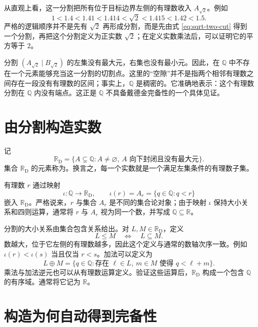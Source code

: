\documentclass[UTF8,12pt,a4paper,fontset=fandol]{ctexbook}
\begin{document}
从直观上看，这一分割把所有位于目标边界左侧的有理数收入 $A_{\sqrt{2}}$。例如
\[
  1<1.4<1.41<1.414<\sqrt{2}<1.415<1.42<1.5.
\]
严格的逻辑顺序并不是先有 $\sqrt{2}$ 再形成分割，而是先由式 \eqref{eq:sqrt-two-cut} 得到一个分割，再把这个分割定义为正实数 $\sqrt{2}$；在定义实数乘法后，可以证明它的平方等于 $2$。

\begin{remark}[有理数域中的空隙]
分割 $(A_{\sqrt{2}}\mid B_{\sqrt{2}})$ 的左集没有最大元，右集也没有最小元。因此，在 $\mathbb{Q}$ 中不存在一个元素能够充当这一分割的切割点。这里的“空隙”并不是指两个相邻有理数之间存在一段没有有理数的区间；事实上，$\mathbb{Q}$ 是稠密的。它准确地表示：这个有理数分割在 $\mathbb{Q}$ 内没有端点。这正是 $\mathbb{Q}$ 不具备戴德金完备性的一个具体见证。
\end{remark}

\section{由分割构造实数}

\begin{definition}[戴德金实数]
记
\[
  \mathbb{R}_{\mathrm D}
  =\bigl\{A\subsetneq\mathbb{Q}:A\ne\varnothing,
  \ A\text{ 向下封闭且没有最大元}\bigr\}.
\]
集合 $\mathbb{R}_{\mathrm D}$ 的元素称为。换言之，每一个实数就是一个满足左集条件的有理数子集。
\end{definition}

有理数 $r$ 通过映射
\[
  \iota:\mathbb{Q}\longrightarrow\mathbb{R}_{\mathrm D},
  \qquad
  \iota(r)=A_r=\{q\in\mathbb{Q}:q<r\}
\]
嵌入 $\mathbb{R}_{\mathrm D}$。严格说来，$r$ 与集合 $A_r$ 是不同的集合论对象；由于映射 $\iota$ 保持大小关系和四则运算，通常将 $r$ 与 $A_r$ 视为同一个数，并写成 $\mathbb{Q}\subseteq\mathbb{R}$。

分割的大小关系由集合包含关系给出。对 $L,M\in\mathbb{R}_{\mathrm D}$，定义
\[
  L\le M\quad\Longleftrightarrow\quad L\subseteq M.
\]
数越大，位于它左侧的有理数越多，因此这个定义与通常的数轴次序一致。例如 $\iota(r)<\iota(s)$ 当且仅当 $r<s$。加法可以定义为
\[
  L\oplus M
  =\{q\in\mathbb{Q}:\text{存在 }\ell\in L,\ m\in M
  \text{ 使得 }q<\ell+m\}.
\]
乘法与加法逆元也可以从有理数运算定义。验证这些运算后，$\mathbb{R}_{\mathrm D}$ 构成一个包含 $\mathbb{Q}$ 的有序域。通常将它记为 $\mathbb{R}$。

\section{构造为何自动得到完备性}
\end{document}
